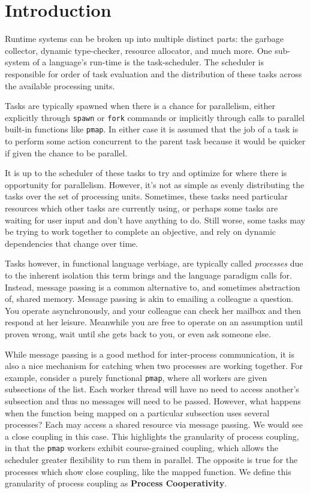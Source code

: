 \chapter{Introduction}
%
\label{chap:introduction}

Runtime systems can be broken up into multiple distinct parts: the garbage 
collector, dynamic type-checker, resource allocator, and much more. One 
sub-system of a language's run-time is the task-scheduler. The scheduler is 
responsible for order of task evaluation and the distribution of 
these tasks across the available processing units.

Tasks are typically spawned when there is a chance for parallelism, either 
explicitly through \texttt{spawn} or \texttt{fork} commands or implicitly 
through calls to parallel built-in functions like \texttt{pmap}. In either 
case it is assumed that the job of a task is to perform some action concurrent 
to the parent task because it would be quicker if given the chance to be 
parallel.

It is up to the scheduler of these tasks to try and optimize for where there
is opportunity for parallelism. However, it's not as simple as evenly 
distributing the tasks over the set of processing units. Sometimes, these 
tasks need particular resources which other tasks are currently using,
or perhaps some tasks are waiting for user input and don't have anything to
do. Still worse, some tasks may be trying to work together to complete an 
objective, and rely on dynamic dependencies that change over time.

Tasks however, in functional language verbiage, are typically called 
{\em processes} due to the inherent isolation this term brings and the language 
paradigm calls for. Instead, message passing is a common alternative to, and 
sometimes abstraction of, shared
memory. Message passing is akin to emailing a colleague a question. You operate
asynchronously, and your colleague can check her mailbox and then
respond at her leisure. Meanwhile you are free to operate on an assumption 
until proven wrong, wait until she gets back to you, or even ask someone else.

While message passing is a good method for inter-process communication, it is
also a nice mechanism for catching when two processes are working together.
For example, consider a purely functional \texttt{pmap}, where all 
workers are given subsections of the list. Each worker thread will have no
need to access another's subsection and thus no messages will need to be passed.
However, what happens when the function being mapped on a particular subsection uses 
several processes? Each may access a shared resource via message passing. 
We would see a close coupling in this case.
This highlights the granularity of process coupling, in that the \texttt{pmap}
workers exhibit course-grained coupling, which allows the scheduler greater 
flexibility to run them in parallel. The opposite is true for the processes 
which show close coupling, like the mapped function. We define this granularity of process
coupling as \textbf{Process Cooperativity}.

